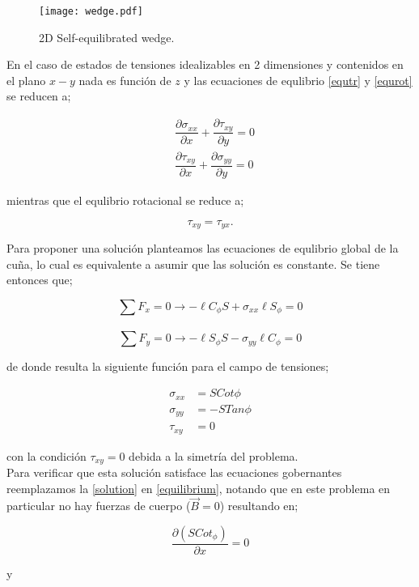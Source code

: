 \documentclass[../notas medios.tex]{subfiles}
\begin{document}
%
\begin{figure}[H]
\centering
\texttt{[image: wedge.pdf]}
\caption{2D Self-equilibrated wedge.}
\label{WEDGE}
\end{figure}

%
En el caso de estados de tensiones idealizables en 2 dimensiones y contenidos en el plano $x-y$ nada es función de $z$ y las ecuaciones de equlibrio \cref{equtr} y \cref{equrot} se reducen a;

\begin{equation}
\begin{aligned}
&\dfrac{\partial\sigma_{xx}}{\partial x}+\dfrac{\partial\tau_{xy}}{\partial y}=0\\
&\dfrac{\partial\tau_{xy}}{\partial x}+\dfrac{\partial\sigma_{yy}}{\partial y}=0
\end{aligned}
\label{equilibrium}
\end{equation}

mientras que el equlibrio rotacional se reduce a;

\[{\tau _{xy}} = {\tau _{yx}}.\]

Para proponer una solución planteamos las ecuaciones de equlibrio global de la cuña, lo cual es equivalente a asumir que las solución es constante. Se tiene entonces que;


\[\sum F_x=0 \longrightarrow -\ell C_\phi S+\sigma_{xx}\ell S_\phi=0\]\\
\[\sum F_y=0 \longrightarrow -\ell S_\phi S-\sigma_{yy}\ell C_\phi=0\] 

de donde resulta la siguiente función para el campo de tensiones;

\begin{equation}
\begin{aligned}
\sigma_{xx}&=SCot\phi\\
\sigma_{yy}&=-STan\phi\\
\tau_{xy}&=0
\end{aligned}
\label{solution}
\end{equation}

con la condición $\tau_{xy}=0$ debida a la simetría del problema.
\\
Para verificar que esta solución satisface las ecuaciones gobernantes reemplazamos la \cref{solution} en \cref{equilibrium}, notando que en este problema en particular no hay fuerzas de cuerpo ($\vec B = 0$)  resultando en;

\[\frac{{\partial (SCo{t_\phi })}}{{\partial x}} = 0\]

y
\end{document}
